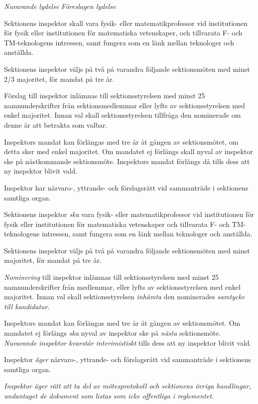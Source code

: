 \documentclass{article}
\newenvironment{lydelse}
    {\begin{paracol}{2}%
        \emph{Nuvarande lydelse}%
        \switchcolumn%
        \emph{Föreslagen lydelse}%
    \end{paracol}%
    \begin{enumerate}[label=\thesubsection.\arabic*]%
    \begin{paracol}{2}%
    }{\end{paracol}\end{enumerate}}
\newcommand{\itemb}{\item[\textbullet]}
\begin{document}
\begin{lydelse}
    \itemb Sektionens inspektor skall vara fysik- eller matematikprofessor vid institutionen för fysik eller institutionen för matematiska vetenskaper, och tillvarata F- och TM-teknologens intressen, samt fungera som en länk mellan teknologer och anställda.
	
	  \itemb Sektionens inspektor väljs på två på varandra följande sektionsmöten med minst 2/3 majoritet, för mandat på tre år. 
	
	  \itemb Förslag till inspektor inlämnas till sektionsstyrelsen med minst 25 namnunderskrifter från sektionsmedlemmar eller lyfts av sektionsstyrelsen med enkel majoritet. Innan val skall sektionsstyrelsen tillfråga den nominerade om denne är att betrakta som valbar.
	
    \itemb Inspektors mandat kan förlängas med tre år åt gången av sektionsmötet, om detta sker med enkel majoritet. Om mandatet ej förlängs skall nyval av inspektor ske på nästkommande sektionsmöte. Inspektors mandat förlängs då tills dess att ny inspektor blivit vald.

    \itemb Inspektor har närvaro-, yttrande- och förslagsrätt vid sammanträde i sektionens samtliga organ.
    
  \switchcolumn
  \setcounter{enumi}{0}
    
    \item Sektionens inspektor \emph{ska} vara fysik- eller matematikprofessor vid institutionen för fysik eller institutionen för matematiska vetenskaper och tillvarata F- och TM-teknologens intressen, samt fungera som en länk mellan teknologer och anställda.
	
	\item Sektionens inspektor väljs på två på varandra följande sektionsmöten med minst  majoritet, för mandat på tre år. 
	
	\item \emph{Nominering} till inspektor inlämnas till sektionsstyrelsen med minst 25 namnunderskrifter från medlemmar, eller lyfts av sektionsstyrelsen med enkel majoritet. Innan val skall sektionsstyrelsen \emph{inhämta} den nominerades \emph{samtycke till kandidatur}.
	
	\item Inspektors mandat kan förlängas med tre år åt gången av sektionsmötet.
	Om mandatet ej förlängs \emph{ska} nyval av inspektor ske på \emph{nästa} sektionsmöte.
	\emph{Nuvarande inspektor kvarstår interimistiskt} tills dess att ny inspektor blivit vald.

    \item Inspektor \emph{äger} närvaro-, yttrande- och förslagsrätt vid sammanträde i sektionens samtliga organ.
    
    \item \emph{Inspektor äger rätt att ta del av mötesprotokoll och sektionens övriga handlingar, undantaget de dokument som listas som icke offentliga i reglementet.}
\end{lydelse}
\end{document}
